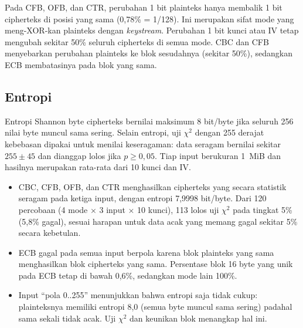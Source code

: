 Pada CFB, OFB, dan CTR, perubahan 1 bit plainteks hanya membalik 1 bit cipherteks di posisi yang
sama (0,78\% = 1/128). Ini merupakan sifat mode yang meng-XOR-kan plainteks dengan \textit{keystream}.
Perubahan 1 bit kunci atau IV tetap mengubah sekitar 50\% seluruh cipherteks di
semua mode. CBC dan CFB menyebarkan perubahan plainteks ke blok sesudahnya (sekitar 50\%), sedangkan
ECB membatasinya pada blok yang sama.

\subsection{Entropi}
Entropi Shannon byte cipherteks bernilai maksimum 8 bit/byte jika seluruh 256 nilai byte
muncul sama sering. Selain entropi, uji $\chi^2$ dengan 255 derajat kebebasan dipakai untuk menilai
keseragaman: data seragam bernilai sekitar $255 \pm 45$ dan dianggap lolos jika $p \ge 0{,}05$.
Tiap input berukuran 1~MiB dan hasilnya merupakan rata-rata dari 10 kunci dan IV.

\begin{table}[H]
  \centering
  \caption{Entropi (bit/byte) dan $\chi^2$ pada input 1~MiB}
\end{table}

\begin{itemize}
  \item CBC, CFB, OFB, dan CTR menghasilkan cipherteks yang secara statistik seragam pada ketiga
    input, dengan entropi 7,9998 bit/byte. Dari 120 percobaan (4 mode $\times$ 3 input $\times$
    10 kunci), 113 lolos uji $\chi^2$ pada tingkat 5\% (5,8\% gagal), sesuai harapan untuk data
    acak yang memang gagal sekitar 5\% secara kebetulan.
  \item ECB gagal pada semua input berpola karena blok plainteks yang sama menghasilkan blok
    cipherteks yang sama. Persentase blok 16 byte yang unik pada ECB tetap di bawah 0,6\%, sedangkan
    mode lain 100\%.
  \item Input ``pola 0..255'' menunjukkan bahwa entropi saja tidak cukup: plainteksnya memiliki
    entropi 8,0 (semua byte muncul sama sering) padahal sama sekali tidak acak. Uji $\chi^2$ dan
    keunikan blok menangkap hal ini.
\end{itemize}

